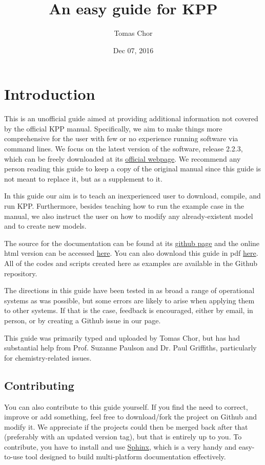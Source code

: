 \documentclass[letterpaper,10pt,openany,oneside]{sphinxmanual}
\title{An easy guide for KPP}
\date{Dec 07, 2016}
\author{Tomas Chor}
\begin{document}
\maketitle
\tableofcontents
{}\label{index::doc}



\chapter{Introduction}
\label{README:introduction}\label{README:easy-guide-to-compiling-and-running-kpp}\label{README::doc}
This is an unofficial guide aimed at providing additional information not
covered by the official KPP manual. Specifically, we aim to make things more
comprehensive for the user with few or no experience running software via
command lines. We focus on the latest version of the software, release 2.2.3,
which can be freely downloaded at its \href{http://people.cs.vt.edu/~asandu/Software/Kpp/}{official webpage}. We recommend any person
reading this guide to keep a copy of the original manual since this guide is
not meant to replace it, but as a supplement to it.

In this guide our aim is to teach an inexperienced user to download, compile,
and run KPP. Furthermore, besides teaching how to run the example case in the
manual, we also instruct the user on how to modify any already-existent model
and to create new models.

The source for the documentation can be found at its \href{https://github.com/tomchor/ezkpp}{github page} and the online html version can be
accessed \href{https://tomchor.github.io/ezkpp/}{here}. You can also download this
guide in pdf \href{https://github.com/tomchor/ezkpp/raw/gh-pages/ezkpp.pdf}{here}.
All of the codes and scripts created here as examples are available in the
Github repository.

The directions in this guide have been tested in as broad a range of
operational systems as was possible, but some errors are likely to arise when
applying them to other systems. If that is the case, feedback is encouraged,
either by email, in person, or by creating a Github issue in our page.

This guide was primarily typed and uploaded by Tomas Chor, but has had
substantial help from Prof. Suzanne Paulson and Dr. Paul Griffiths,
particularly for chemistry-related issues.


\section{Contributing}
\label{README:contributing}
You can also contribute to this guide yourself. If you find the need to
correct, improve or add something, feel free to download/fork the project on
Github and modify it. We appreciate if the projects could then be merged back
after that (preferably with an updated version tag), but that is entirely up
to you. To contribute, you have to install and use \href{http://sphinx-doc.org/}{Sphinx}, which is a very handy and easy-to-use tool designed
to build multi-platform documentation effectively.
\end{document}

